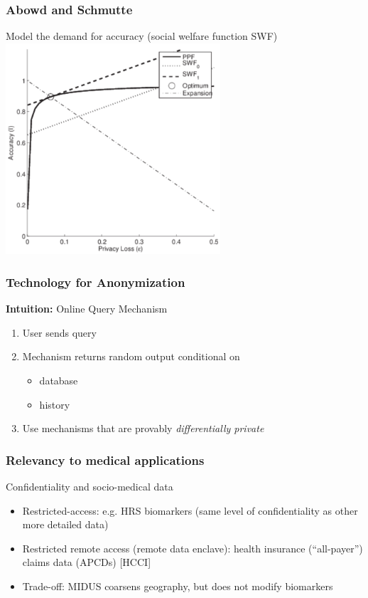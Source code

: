 \begin{frame}
	\frametitle{Abowd and Schmutte}
	\begin{block}{Model the demand for accuracy (social welfare function SWF)}
\centering
\includegraphics[width=0.6\textwidth]{plannersprob_health_complex}		
	\end{block}
\end{frame}
 \begin{frame}

 \frametitle{Technology for Anonymization}

 \textbf{Intuition:} Online Query Mechanism
 \begin{enumerate}
 	\item User sends query\vspace{.25in} 
 	\item Mechanism returns random output conditional on
 	\begin{itemize}
 		\item database
 		\item history\vspace{.25in} 
 	\end{itemize}
 	\item Use mechanisms that are provably \textit{differentially private}

 \end{enumerate}
 \end{frame}


\begin{frame}
	\frametitle{Relevancy to medical applications}
\begin{block}{Confidentiality and socio-medical data}
\begin{itemize}
	\item Restricted-access: e.g. \ac{HRS} biomarkers (same level of confidentiality as other more detailed data)
	\item Restricted remote access (remote data enclave): health insurance (``all-payer'') claims data (APCDs) [\ac{HCCI}]
	\item Trade-off: \ac{MIDUS} coarsens geography, but does not modify biomarkers
\end{itemize}

\end{block}

\end{frame}



